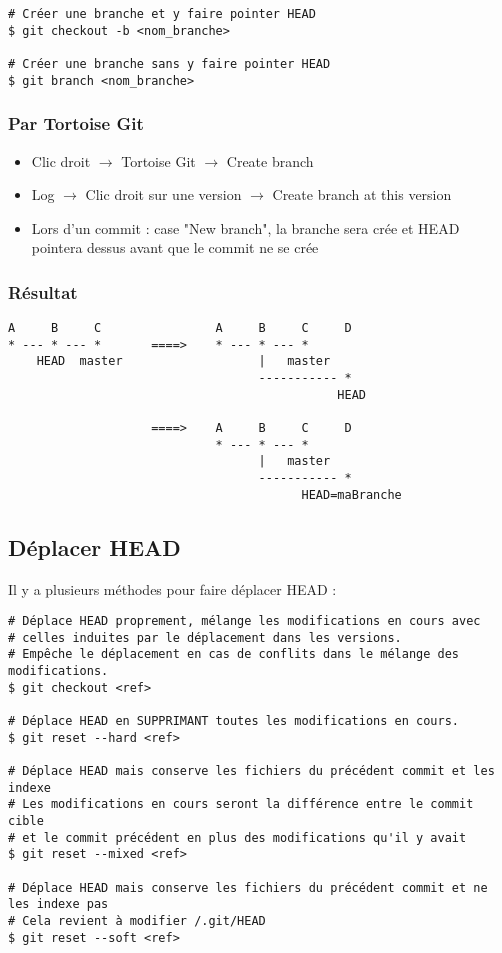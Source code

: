 \begin{verbatim}
# Créer une branche et y faire pointer HEAD
$ git checkout -b <nom_branche>

# Créer une branche sans y faire pointer HEAD
$ git branch <nom_branche>
\end{verbatim}

\subsubsection{Par Tortoise Git}
\begin{itemize}
\item Clic droit $\rightarrow$ Tortoise Git $\rightarrow$ Create branch
\item Log $\rightarrow$ Clic droit sur une version $\rightarrow$ Create branch at this version
\item Lors d'un commit : case "New branch", la branche sera crée et HEAD pointera dessus avant que le commit ne se crée
\end{itemize}

\subsubsection{Résultat}
\begin{verbatim}
A     B     C                A     B     C     D
* --- * --- *       ====>    * --- * --- *
    HEAD  master                   |   master
                                   ----------- *
                                              HEAD                                              

                    ====>    A     B     C     D
                             * --- * --- *
                                   |   master
                                   ----------- *
                                         HEAD=maBranche
\end{verbatim}

\newpage
\subsection{Déplacer HEAD}

Il y a plusieurs méthodes pour faire déplacer HEAD :\\

\begin{verbatim}
# Déplace HEAD proprement, mélange les modifications en cours avec  
# celles induites par le déplacement dans les versions.
# Empêche le déplacement en cas de conflits dans le mélange des modifications.
$ git checkout <ref>

# Déplace HEAD en SUPPRIMANT toutes les modifications en cours.
$ git reset --hard <ref>

# Déplace HEAD mais conserve les fichiers du précédent commit et les indexe
# Les modifications en cours seront la différence entre le commit cible 
# et le commit précédent en plus des modifications qu'il y avait
$ git reset --mixed <ref>

# Déplace HEAD mais conserve les fichiers du précédent commit et ne les indexe pas
# Cela revient à modifier /.git/HEAD
$ git reset --soft <ref>
\end{verbatim}

